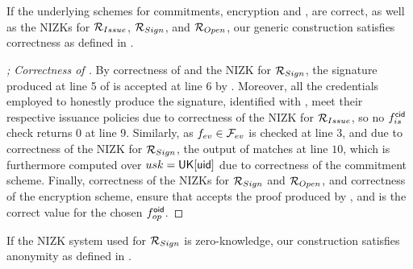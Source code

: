 \begin{theorem}
  \label{thm:correctness-uas}
  If the underlying schemes for commitments, encryption and \SBCM, are correct,
  as well as the NIZKs for $\mathcal{R}_{Issue}$, $\mathcal{R}_{Sign}$, and
  $\mathcal{R}_{Open}$, our generic construction \CUASGen satisfies correctness as
  defined in .
\end{theorem}

\begin{proof}[; Correctness of \CUASGen]
  By correctness of \SBCM and the NIZK for $\mathcal{R}_{Sign}$, the signature
  produced at line 5 of \ExpCorrect is accepted at line 6 by \Verify.
  Moreover, all the credentials employed to honestly produce the signature,
  identified with \scid, meet their respective issuance policies due to
  correctness of the NIZK for $\mathcal{R}_{Issue}$, so no $f_{is}^\mathsf{cid}$ check
  returns $0$ at line 9. Similarly, as $f_{ev} \in \mathcal{F}_{ev}$ is checked at
  line 3, and due to correctness of the NIZK for $\mathcal{R}_{Sign}$, the
  output of \feval matches \yeval at line $10$, which is furthermore computed
  over $usk=\mathsf{UK}[\mathsf{uid}]$ due to correctness of the commitment scheme. Finally,
  correctness of the NIZKs for $\mathcal{R}_{Sign}$ and $\mathcal{R}_{Open}$, and
  correctness of the encryption scheme, ensure that \Judge accepts the proof
  produced by \Open, and \yinsp is the correct value for the chosen
  $f_{op}^{\mathsf{oid}}$.
\end{proof}

\begin{theorem}
  \label{thm:anonymity-uas}
  If the NIZK system used for $\mathcal{R}_{Sign}$ is zero-knowledge, our
  \CUASGen construction satisfies anonymity as defined in
  .
\end{theorem}

